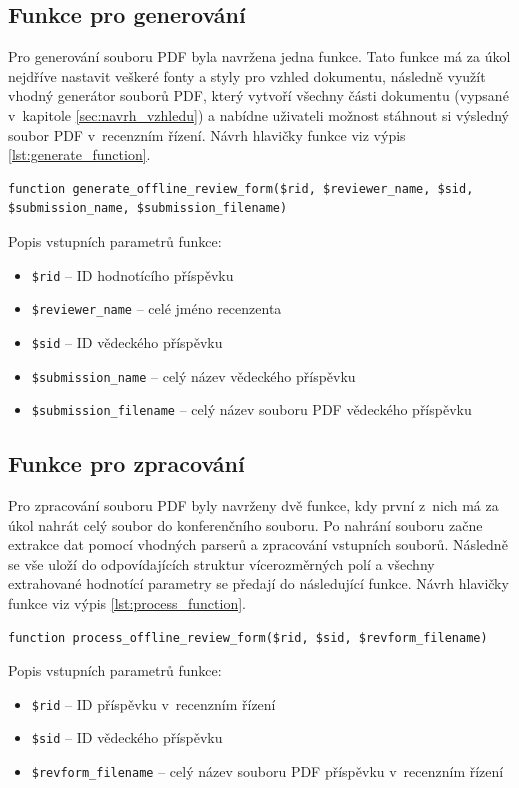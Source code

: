 \subsection{Funkce pro generování}
Pro generování souboru PDF byla navržena jedna funkce. Tato funkce má za úkol nejdříve nastavit veškeré fonty a styly pro vzhled dokumentu, následně využít vhodný generátor souborů  PDF, který vytvoří všechny části dokumentu (vypsané v~kapitole \ref{sec:navrh_vzhledu}) a nabídne uživateli možnost stáhnout si výsledný soubor PDF v~recenzním řízení. Návrh hlavičky funkce viz výpis \ref{lst:generate_function}.

\lstset{style=phpstyle}
\begin{lstlisting}[caption = {Návrh hlavičky funkce pro generování souboru PDF}, label = {lst:generate_function}, captionpos=b]
function generate_offline_review_form($rid, $reviewer_name, $sid, $submission_name, $submission_filename)
\end{lstlisting}
Popis vstupních parametrů funkce:
\begin{itemize}
	\item\verb|$rid| -- ID hodnotícího příspěvku
	\item\verb|$reviewer_name| -- celé jméno recenzenta
	\item\verb|$sid| -- ID vědeckého příspěvku
	\item\verb|$submission_name| -- celý název vědeckého příspěvku
	\item\verb|$submission_filename| -- celý název souboru PDF vědeckého příspěvku
\end{itemize}

\subsection{Funkce pro zpracování}
Pro zpracování souboru PDF byly navrženy dvě funkce, kdy první z~nich má za úkol nahrát celý soubor do konferenčního souboru. Po nahrání souboru začne extrakce dat pomocí vhodných parserů a zpracování vstupních souborů. Následně se vše uloží do odpovídajících struktur vícerozměrných polí a všechny extrahované hodnotící parametry se předají do následující funkce. Návrh hlavičky funkce viz výpis \ref{lst:process_function}.

\begin{lstlisting}[caption = {Návrh hlavičky funkce pro extrakci dat}, label = {lst:process_function}, captionpos=b]
function process_offline_review_form($rid, $sid, $revform_filename)
\end{lstlisting}
Popis vstupních parametrů funkce:
\begin{itemize}
	\item\verb|$rid| -- ID příspěvku v~recenzním řízení
	\item\verb|$sid| -- ID vědeckého příspěvku
	\item\verb|$revform_filename| -- celý název souboru PDF příspěvku v~recenzním řízení
\end{itemize}

